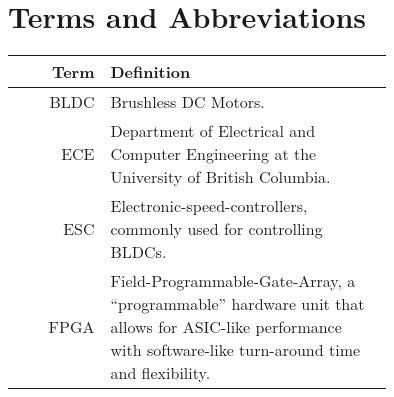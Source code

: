\section*{Terms and Abbreviations}\label{sec:terms}

\begin{tabular}[h]{rp{0.75\linewidth}}
    \hline
    \textbf{Term} & \textbf{Definition}\\
    \hline

    BLDC & Brushless DC Motors. \\
    ECE & Department of Electrical and Computer Engineering at the University of British Columbia.\\
    ESC & Electronic-speed-controllers, commonly used for controlling BLDCs.\\
    FPGA & Field-Programmable-Gate-Array, a ``programmable'' hardware unit that allows for ASIC-like performance with software-like turn-around time and flexibility.\\

\end{tabular}
